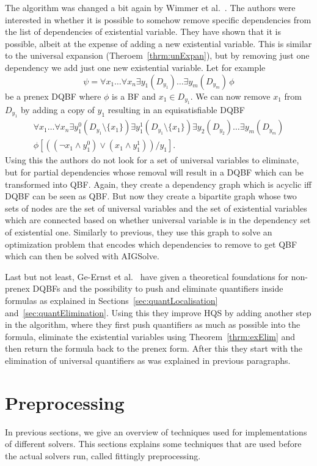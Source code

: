 \documentclass[
  digital, %
  color,
  twoside, %
  table,   %
  nolof,     %
  nolot,     %
]{fithesis3}
\theoremstyle{definition}
\theoremstyle{remark}
\newcommand{\itholds}{\,}
\begin{document}
The algorithm was changed a bit again by Wimmer et al.~\cite{HQSdependencyElimination}. The authors were interested in whether it is possible to somehow remove specific dependencies from the list of dependencies of existential variable. They have shown that it is possible, albeit at the expense of adding a new existential variable. This is similar to the universal expansion (Theroem~\ref{thrm:unExpan}), but by removing just one dependency we add just one new existential variable. Let for example
\[\psi = \forall x_1 \dots \forall x_n \exists y_1(D_{y_1}) \dots \exists y_m(D_{y_m}) \itholds \phi\]
be a prenex DQBF where $\phi$ is a BF and $x_1 \in D_{y_1}$. We can now remove $x_1$ from $D_{y_1}$ by adding a copy of $y_1$ resulting in an equisatisfiable DQBF
\begin{multline*}
\forall x_1 \dots \forall x_n \exists y_1^0(D_{y_1} \setminus \{x_1\}) \exists y_1^1(D_{y_1} \setminus \{x_1\}) \exists y_2(D_{y_2})\dots \exists y_m(D_{y_m}) \\
\phi\left[((\neg x_1 \land y_1^0) \lor (x_1 \land y_1^1))/y_1\right].
\end{multline*}
Using this the authors do not look for a set of universal variables to eliminate, but for partial dependencies whose removal will result in a DQBF which can be transformed into QBF. Again, they create a dependency graph which is acyclic iff DQBF can be seen as QBF. But now they create a bipartite graph whose two sets of nodes are the set of universal variables and the set of existential variables which are connected based on whether universal variable is in the dependency set of existential one. Similarly to previous, they use this graph to solve an optimization problem that encodes which dependencies to remove to get QBF which can then be solved with AIGSolve.

Last but not least, Ge-Ernst et al.~\cite{HQSquantifierLocalisation} have given a theoretical foundations for non-prenex DQBFs and the possibility to push and eliminate quantifiers inside formulas as explained in Sections~\ref{sec:quantLocalisation} and~\ref{sec:quantElimination}. Using this they improve HQS by adding another step in the algorithm, where they first push quantifiers as much as possible into the formula, eliminate the existential variables using Theorem~\ref{thrm:exElim} and then return the formula back to the prenex form. After this they start with the elimination of universal quantifiers as was explained in previous paragraphs.

\section{Preprocessing}
\label{sec:preprocessing}
In previous sections, we give an overview of techniques used for implementations of different solvers. This sections explains some techniques that are used before the actual solvers run, called fittingly preprocessing.
\end{document}
